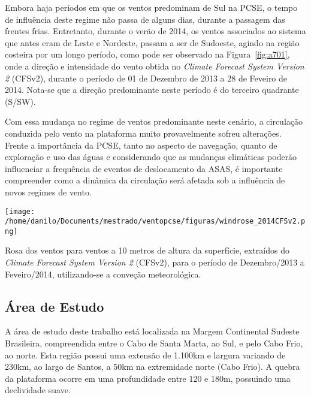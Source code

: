\hspace{6mm} Embora haja períodos em que os ventos predominam de Sul na PCSE, o tempo de 
influência deste regime não passa de alguns dias, durante a passagem das frentes frias.
Entretanto, durante o verão de 2014, os ventos associados ao sistema que antes eram de Leste e 
Nordeste, passam a ser de Sudoeste, agindo na região costeira por um longo período, como 
pode ser observado na Figura~\ref{fig:a701}, onde a direção e intensidade do vento 
obtida no \textit{Climate Forecast System Version 2} (CFSv2), durante o período de 
01 de Dezembro de 2013 a 28 de Feveiro de 2014. Nota-se que a direção
predominante neste período é do terceiro quadrante (S/SW).

\hspace{6mm} Com essa mudança no regime de ventos predominante neste 
cenário, a circulação conduzida pelo vento na plataforma muito provavelmente sofreu alterações.
Frente a importância da PCSE, tanto no aspecto de navegação, quanto de
exploração e uso das águas e considerando que as mudanças climáticas poderão 
influenciar a frequência de eventos de deslocamento da ASAS, é importante compreender 
como a dinâmica da circulação será afetada sob a influência de novos regimes
de vento.

\begin{figurehere}
  \centerline{\hbox{\texttt{[image: /home/danilo/Documents/mestrado/ventopcse/figuras/windrose\_2014CFSv2.png]}}}
  \vspace{-.1in}
  \caption{Rosa dos ventos para ventos a 10 metros de altura da superfície, extraídos do \textit{Climate Forecast System Version 2}
  (CFSv2), para o período de Dezembro/2013 a Feveiro/2014, utilizando-se a conveção meteorológica.}
\label{fig:a701}
\end{figurehere}
\bigskip

\subsection{Área de Estudo}
\label{sub:areaestudo}

\hspace{6mm} A área de estudo deste trabalho está localizada na Margem Continental
Sudeste Brasileira, compreendida entre o Cabo de Santa Marta, ao Sul, e pelo
Cabo Frio, ao norte. Esta região possui uma extensão de 1.100km e largura variando de 230km, ao
largo de Santos, a 50km na extremidade norte (Cabo Frio). A quebra da plataforma
ocorre em uma profundidade entre 120 e 180m, possuindo uma declividade suave. 

